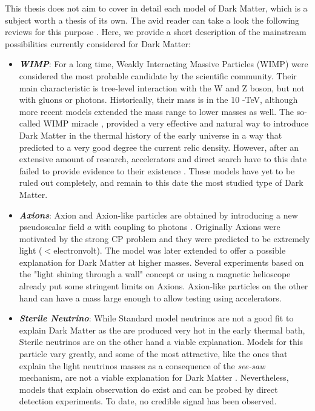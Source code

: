 This thesis does not aim to cover in detail each model of Dark Matter, which is a subject worth a thesis of its own. The avid reader can take a look the following reviews for this purpose \cite{battaglieri2017cosmic,Profumo:2019ujg,HAMBYE2020135553,alex2016dark,review-particle-physics,Feng:2010gw}. Here, we provide a short description of the mainstream possibilities currently considered for Dark Matter:
\begin{itemize}
\item \textbf{\textit{WIMP}}: For a long time, Weakly Interacting Massive Particles (WIMP) were considered the most probable candidate by the scientific community. Their main characteristic is tree-level interaction with the W and Z boson, but not with gluons or photons. Historically, their mass is in the 10 \gev-\si{\tera\electronvolt}, although more recent models extended the mass range to lower masses as well. The so-called WIMP miracle \cite{Chang:2013oia}, provided a very effective and natural way to introduce Dark Matter in the thermal history of the early universe in a way that predicted to a very good degree the current relic density. However, after an extensive amount of research, accelerators and direct search have to this date failed to provide evidence to their existence \cite{Arcadi:2017kky}. These models have yet to be ruled out completely, and remain to this date the most studied type of Dark Matter.
\item \textbf{\textit{Axions}}: Axion and Axion-like particles are obtained by introducing a new pseudoscalar field $a$ with coupling to photons \cite{Marsh:2015xka}. Originally Axions were motivated by the strong CP problem and they were predicted to be extremely light ($<$\si{electronvolt}). The model was later extended to offer a possible explanation for Dark Matter at higher masses. Several experiments based on the "light shining through a wall" concept or using a magnetic helioscope \cite{annurev.nucl.56.080805.140513} already put some stringent limits on Axions. Axion-like particles on the other hand can have a mass large enough to allow testing using accelerators.
\item \textbf{\textit{Sterile Neutrino}}: While Standard model neutrinos are not a good fit to explain Dark Matter as the are produced very hot in the early thermal bath, Sterile neutrinos are on the other hand a viable explanation. Models for this particle vary greatly, and some of the most attractive, like the ones that explain the light neutrinos masses as a consequence of the \textit{see-saw} mechanism, are not a viable explanation for Dark Matter \cite{Feng:2010gw}. Nevertheless, models that explain observation do exist and can be probed by direct detection experiments. To date, no credible signal has been observed.

\end{itemize}
